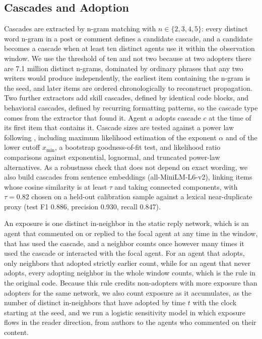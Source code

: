 \documentclass{article}
\begin{document}
\subsection{Cascades and Adoption}

Cascades are extracted by n-gram matching with $n \in \{2,3,4,5\}$: every distinct word n-gram in a post or comment defines a candidate cascade, and a candidate becomes a cascade when at least ten distinct agents use it within the observation window. We use the threshold of ten and not two because at two adopters there are 7.1 million distinct n-grams, dominated by ordinary phrases that any two writers would produce independently, the earliest item containing the n-gram is the seed, and later items are ordered chronologically to reconstruct propagation. Two further extractors add skill cascades, defined by identical code blocks, and behavioral cascades, defined by recurring formatting patterns, so the cascade type comes from the extractor that found it. Agent $a$ adopts cascade $c$ at the time of its first item that contains it. Cascade sizes are tested against a power law following \citet{clauset2009power}, including maximum likelihood estimation of the exponent $\alpha$ and of the lower cutoff $x_{\min}$, a bootstrap goodness-of-fit test, and likelihood ratio comparisons against exponential, lognormal, and truncated power-law alternatives. As a robustness check that does not depend on exact wording, we also build cascades from sentence embeddings (all-MiniLM-L6-v2), linking items whose cosine similarity is at least $\tau$ and taking connected components, with $\tau = 0.82$ chosen on a held-out calibration sample against a lexical near-duplicate proxy (test F1 0.886, precision 0.930, recall 0.847).

An exposure is one distinct in-neighbor in the static reply network, which is an agent that commented on or replied to the focal agent at any time in the window, that has used the cascade, and a neighbor counts once however many times it used the cascade or interacted with the focal agent. For an agent that adopts, only neighbors that adopted strictly earlier count, while for an agent that never adopts, every adopting neighbor in the whole window counts, which is the rule in the original code. Because this rule credits non-adopters with more exposure than adopters for the same network, we also count exposure as it accumulates, as the number of distinct in-neighbors that have adopted by time $t$ with the clock starting at the seed, and we run a logistic sensitivity model in which exposure flows in the reader direction, from authors to the agents who commented on their content.
\end{document}
